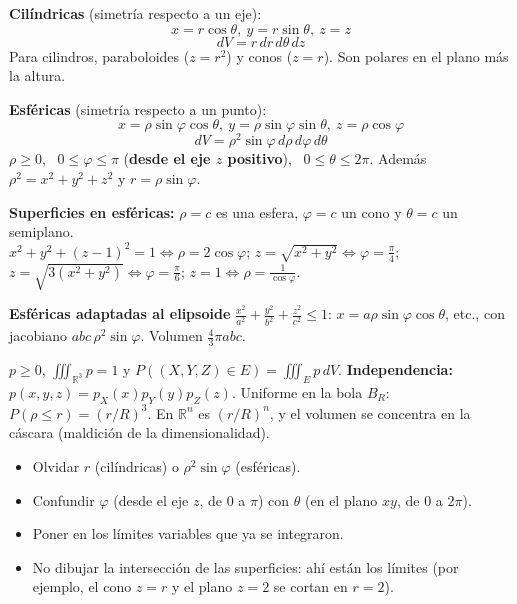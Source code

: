\documentclass[11pt,a4paper]{article}
\newcommand{\R}{\mathbb{R}}
\newcommand{\dV}{\,dV}
\begin{document}
\begin{resumen}
\begin{minipage}[t]{0.47\textwidth}
\textbf{Cilíndricas} (simetría respecto a un eje):
\[
x=r\cos\theta,\ y=r\sin\theta,\ z=z
\]
\[
\boxed{dV=r\,dr\,d\theta\,dz}
\]
Para cilindros, paraboloides ($z=r^2$) y conos ($z=r$). Son polares en el plano más la altura.
\end{minipage}\hfill
\begin{minipage}[t]{0.49\textwidth}
\textbf{Esféricas} (simetría respecto a un punto):
\[
x=\rho\sin\varphi\cos\theta,\ y=\rho\sin\varphi\sin\theta,\ z=\rho\cos\varphi
\]
\[
\boxed{dV=\rho^2\sin\varphi\,d\rho\,d\varphi\,d\theta}
\]
$\rho\ge0$, \ $0\le\varphi\le\pi$ (\textbf{desde el eje $z$ positivo}), \ $0\le\theta\le2\pi$. Además $\rho^2=x^2+y^2+z^2$ y $r=\rho\sin\varphi$.
\end{minipage}

\medskip
\textbf{Superficies en esféricas:} $\rho=c$ es una esfera, $\varphi=c$ un cono y $\theta=c$ un semiplano.\\
$x^2+y^2+(z-1)^2=1\iff\rho=2\cos\varphi$; \quad $z=\sqrt{x^2+y^2}\iff\varphi=\frac\pi4$; \quad $z=\sqrt{3(x^2+y^2)}\iff\varphi=\frac\pi6$; \quad $z=1\iff\rho=\frac1{\cos\varphi}$.

\textbf{Esféricas adaptadas al elipsoide} $\frac{x^2}{a^2}+\frac{y^2}{b^2}+\frac{z^2}{c^2}\le1$: $x=a\rho\sin\varphi\cos\theta$, etc., con jacobiano $abc\,\rho^2\sin\varphi$. Volumen $\frac43\pi abc$.
\end{resumen}

\begin{resumen}[Probabilidad en $\R^3$]
$p\ge0$, $\iiint_{\R^3}p=1$ y $P((X,Y,Z)\in E)=\iiint_E p\dV$. \textbf{Independencia:} $p(x,y,z)=p_X(x)p_Y(y)p_Z(z)$.
Uniforme en la bola $B_R$: $P(\rho\le r)=(r/R)^3$. En $\R^n$ es $(r/R)^n$, y el volumen se concentra en la cáscara (maldición de la dimensionalidad).
\end{resumen}

\begin{ojo}
\begin{itemize}[leftmargin=*,itemsep=1pt]
\item Olvidar $r$ (cilíndricas) o $\rho^2\sin\varphi$ (esféricas).
\item Confundir $\varphi$ (desde el eje $z$, de $0$ a $\pi$) con $\theta$ (en el plano $xy$, de $0$ a $2\pi$).
\item Poner en los límites variables que ya se integraron.
\item No dibujar la intersección de las superficies: ahí están los límites (por ejemplo, el cono $z=r$ y el plano $z=2$ se cortan en $r=2$).
\end{itemize}
\end{ojo}
\end{document}
